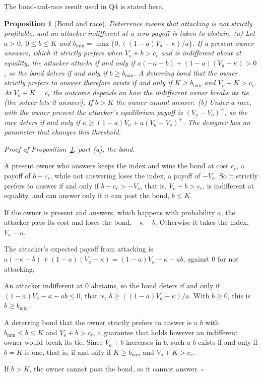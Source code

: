 \documentclass[11pt]{article}
\newtheorem{proposition}{Proposition}
\newenvironment{steps}{\begin{list}{}{\setlength{\leftmargin}{3.6em}\setlength{\labelwidth}{3.2em}\setlength{\labelsep}{0.4em}\setlength{\itemsep}{2pt}\setlength{\topsep}{3pt}\setlength{\parsep}{0pt}\renewcommand{\makelabel}[1]{##1\hfil}}}{\end{list}}
\begin{document}
The bond-and-race result used in Q4 is stated here.

\begin{proposition}[Bond and race]\label{prop:contest}
Deterrence means that attacking is not strictly profitable, and an attacker indifferent at a zero payoff is taken to abstain. (a) Let $a>0$, $0\le b\le K$ and $b_{\min}=\max\{0,((1-a)V_a-\kappa)/a\}$. If a present owner answers, which it strictly prefers when $V_o+b>c_r$ and is indifferent about at equality, the attacker attacks if and only if $a(-\kappa-b)+(1-a)(V_a-\kappa)>0$, so the bond deters if and only if $b\ge b_{\min}$. A deterring bond that the owner strictly prefers to answer therefore exists if and only if $K\ge b_{\min}$ and $V_o+K>c_r$. At $V_o+K=c_r$ the outcome depends on how the indifferent owner breaks its tie (the solver lets it answer). If $b>K$ the owner cannot answer. (b) Under a race, with the owner present the attacker's equilibrium payoff is $(V_a-V_o)^+$, so the race deters if and only if $\kappa\ge(1-a)V_a+a(V_a-V_o)^+$. The designer has no parameter that changes this threshold.
\end{proposition}
\emph{Proof of Proposition~\ref{prop:contest}, part (a), the bond.}
\begin{steps}
\item[\emph{Step 1.}] A present owner who answers keeps the index and wins the bond at cost $c_r$, a payoff of $b-c_r$, while not answering loses the index, a payoff of $-V_o$. So it strictly prefers to answer if and only if $b-c_r>-V_o$, that is, $V_o+b>c_r$, is indifferent at equality, and can answer only if it can post the bond, $b\le K$.
\item[\emph{Step 2.}] If the owner is present and answers, which happens with probability $a$, the attacker pays its cost and loses the bond, $-\kappa-b$. Otherwise it takes the index, $V_a-\kappa$.
\item[\emph{Step 3.}] The attacker's expected payoff from attacking is $a(-\kappa-b)+(1-a)(V_a-\kappa)=(1-a)V_a-\kappa-ab$, against $0$ for not attacking.
\item[\emph{Step 4.}] An attacker indifferent at $0$ abstains, so the bond deters if and only if $(1-a)V_a-\kappa-ab\le0$, that is, $b\ge((1-a)V_a-\kappa)/a$. With $b\ge0$, this is $b\ge b_{\min}$.
\item[\emph{Step 5.}] A deterring bond that the owner strictly prefers to answer is a $b$ with $b_{\min}\le b\le K$ and $V_o+b>c_r$, a guarantee that holds however an indifferent owner would break its tie. Since $V_o+b$ increases in $b$, such a $b$ exists if and only if $b=K$ is one, that is, if and only if $K\ge b_{\min}$ and $V_o+K>c_r$.
\item[\emph{Step 6.}] If $b>K$, the owner cannot post the bond, so it cannot answer. \hfill$\square$
\end{steps}
\end{document}
